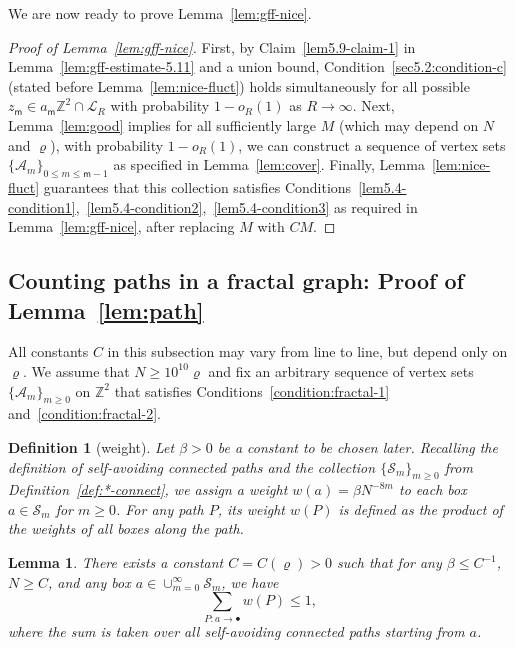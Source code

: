 \documentclass[a4paper]{article}
\numberwithin{equation}{section}
\newtheorem{lemma}[theorem]{Lemma}
\newtheorem{definition}[theorem]{Definition}
\numberwithin{equation}{section}
\renewcommand{\1}{\mathbf{1}}
\begin{document}
We are now ready to prove Lemma~\ref{lem:gff-nice}.

\begin{proof}[Proof of Lemma~\ref{lem:gff-nice}]
    First, by Claim~\ref{lem5.9-claim-1} in Lemma~\ref{lem:gff-estimate-5.11} and a union bound, Condition~\eqref{sec5.2:condition-c} (stated before Lemma~\ref{lem:nice-fluct}) holds simultaneously for all possible $z_{\mathsf m} \in a_{\mathsf m} \mathbb{Z}^2 \cap \mathscr{L}_R$ with probability $1 - o_R(1)$ as $R \to \infty$. Next, Lemma~\ref{lem:good} implies for all sufficiently large $M$ (which may depend on $N$ and $\varrho$), with probability $1-o_R(1)$, we can construct a sequence of vertex sets $\{\mathcal{A}_m\}_{0 \leq m \leq \mathsf m-1}$ as specified in Lemma~\ref{lem:cover}. Finally, Lemma~\ref{lem:nice-fluct} guarantees that this collection satisfies Conditions~\ref{lem5.4-condition1},~\ref{lem5.4-condition2},~\ref{lem5.4-condition3} as required in Lemma~\ref{lem:gff-nice}, after replacing $M$ with $CM$.
\end{proof}


\subsection{Counting paths in a fractal graph: Proof of Lemma~\ref{lem:path}}\label{subsec:count}

All constants $C$ in this subsection may vary from line to line, but depend only on $\varrho$. We assume that $N \geq 10^{10} \varrho $ and fix an arbitrary sequence of vertex sets $\{\mathcal{A}_m\}_{m \geq 0}$ on $\mathbb{Z}^2$ that satisfies Conditions~\ref{condition:fractal-1} and~\ref{condition:fractal-2}.

\begin{definition}[weight]
    Let $\beta>0$ be a constant to be chosen later. Recalling the definition of self-avoiding connected paths and the collection $\{\mathcal{S}_m\}_{m \geq 0}$ from Definition~\ref{def:*-connect}, we assign a weight $w(a) = \beta N^{-8m}$ to each box $a \in \mathcal{S}_m$ for $m \ge 0$. For any path $P$, its weight $w(P)$ is defined as the product of the weights of all boxes along the path.
\end{definition}

\begin{lemma}\label{lem:weight}
    There exists a constant $C = C(\varrho)>0$ such that for any $\beta \leq C^{-1}$, $N \geq C$, and any box $a \in \cup_{m=0}^\infty \mathcal{S}_m$, we have
    $$
    \sum_{P : a \to \bullet} w(P) \leq 1,
    $$
    where the sum is taken over all self-avoiding connected paths starting from $a$.
\end{lemma}
\end{document}
